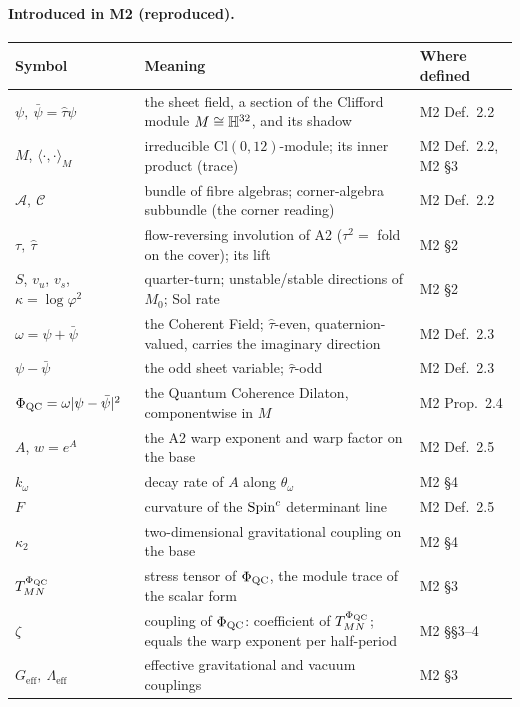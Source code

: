 \paragraph{Introduced in M2 (reproduced).}
\begin{center}\small
\begin{tabular}{@{}p{}p{}p{}@{}}
\toprule
Symbol & Meaning & Where defined \\
\midrule
$\psi,\ \bar\psi=\hat\tau\psi$ & the sheet field, a section of the Clifford module $M\cong\mathbb{H}^{32}$, and its shadow & M2 Def.~2.2 \\
$M$, $\langle\cdot,\cdot\rangle_{M}$ & irreducible $\mathrm{Cl}(0,12)$-module; its inner product (trace) & M2 Def.~2.2, M2 \S3 \\
$\mathcal{A},\ \mathcal{C}$ & bundle of fibre algebras; corner-algebra subbundle (the corner reading) & M2 Def.~2.2 \\
$\tau,\ \hat\tau$ & flow-reversing involution of A2 ($\tau^{2}=$ fold on the cover); its lift & M2 \S2 \\
$S$, $v_{u}$, $v_{s}$, $\kappa=\log\varphi^{2}$ & quarter-turn; unstable/stable directions of $M_{0}$; Sol rate & M2 \S2 \\
$\omega=\psi+\bar\psi$ & the Coherent Field; $\hat\tau$-even, quaternion-valued, carries the imaginary direction & M2 Def.~2.3 \\
$\psi-\bar\psi$ & the odd sheet variable; $\hat\tau$-odd & M2 Def.~2.3 \\
$\Phi_{\mathrm{QC}}=\omega\lvert\psi-\bar\psi\rvert^{2}$ & the Quantum Coherence Dilaton, componentwise in $M$ & M2 Prop.~2.4 \\
$A$, $w=e^{A}$ & the A2 warp exponent and warp factor on the base & M2 Def.~2.5 \\
$k_{\omega}$ & decay rate of $A$ along $\theta_{\omega}$ & M2 \S4 \\
$F$ & curvature of the $\text{Spin}^c$ determinant line & M2 Def.~2.5 \\
$\kappa_{2}$ & two-dimensional gravitational coupling on the base & M2 \S4 \\
$T^{\Phi_{\mathrm{QC}}}_{MN}$ & stress tensor of $\Phi_{\mathrm{QC}}$, the module trace of the scalar form & M2 \S3 \\
$\zeta$ & coupling of $\Phi_{\mathrm{QC}}$: coefficient of $T^{\Phi_{\mathrm{QC}}}_{MN}$; equals the warp exponent per half-period & M2 \S\S3--4 \\
$G_{\mathrm{eff}},\ \Lambda_{\mathrm{eff}}$ & effective gravitational and vacuum couplings & M2 \S3 \\
\bottomrule
\end{tabular}
\end{center}

